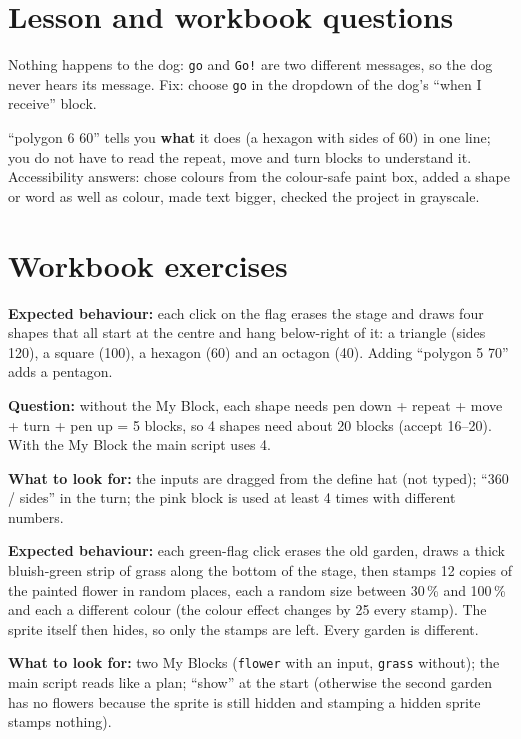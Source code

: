 
\section{Lesson and workbook questions}
\begin{answer}
Nothing happens to the dog: \texttt{go} and \texttt{Go!} are two different messages, so the dog never hears its message. Fix: choose \texttt{go} in the dropdown of the dog's \enquote{when I receive} block.
\end{answer}

\begin{answer}[Reflection]
\enquote{polygon 6 60} tells you \textbf{what} it does (a hexagon with sides of 60) in one line; you do not have to read the repeat, move and turn blocks to understand it. Accessibility answers: chose colours from the colour-safe paint box, added a shape or word as well as colour, made text bigger, checked the project in grayscale.
\end{answer}

\section{Workbook exercises}
\begin{answer}
\textbf{Expected behaviour:} each click on the flag erases the stage and draws four shapes that all start at the centre and hang below-right of it: a triangle (sides 120), a square (100), a hexagon (60) and an octagon (40). Adding \enquote{polygon 5 70} adds a pentagon.

\textbf{Question:} without the My Block, each shape needs pen down + repeat + move + turn + pen up = 5 blocks, so 4 shapes need about 20 blocks (accept 16--20). With the My Block the main script uses 4.

\textbf{What to look for:} the inputs are dragged from the define hat (not typed); \enquote{360 / sides} in the turn; the pink block is used at least 4 times with different numbers.
\end{answer}

\begin{answer}
\textbf{Expected behaviour:} each green-flag click erases the old garden, draws a thick bluish-green strip of grass along the bottom of the stage, then stamps 12 copies of the painted flower in random places, each a random size between 30\,\% and 100\,\% and each a different colour (the colour effect changes by 25 every stamp). The sprite itself then hides, so only the stamps are left. Every garden is different.

\textbf{What to look for:} two My Blocks (\texttt{flower} with an input, \texttt{grass} without); the main script reads like a plan; \enquote{show} at the start (otherwise the second garden has no flowers because the sprite is still hidden and stamping a hidden sprite stamps nothing).
\end{answer}

